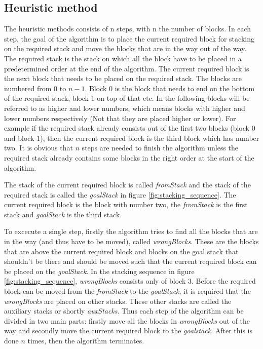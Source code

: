 \documentclass{article}
\begin{document}
	\subsection{Heuristic method}
	\par The heuristic methods consists of n steps, with n the number of blocks. 
	In each step, the goal of the algorithm is to place the current required block for stacking on the required stack and move the blocks that are in the way out of the way. The required stack is the stack on which all the block have to be placed in a predetermined order at the end of the algorithm. The current required block is the next block that needs to be placed on the required stack. The blocks are numbered from $0$ to $n-1$. Block $0$ is the block that needs to end on the bottom of the required stack, block 1 on top of that etc. In the following blocks will be referred to as higher and lower numbers, which means blocks with higher and lower numbers respectively (Not that they are placed higher or lower). For example if the required stack already consists out of the first two blocks (block $0$ and block $1$), then the current required block is the third block which has number two. It is obvious that $n$ steps are needed to finish the algorithm unless the required stack already contains some blocks in the right order at the start of the algorithm. 
	
	\par The stack of the current required block is called \textit{fromStack} and the stack of the required stack is called the \textit{goalStack} in figure \ref{fig:stacking_sequence}. The current required block is the block with number two, the \textit{fromStack} is the first stack and \textit{goalStack} is the third stack.
	
	\par To excecute a single step, firstly the algorithm tries to find all the blocks that are in the way (and thus have to be moved), called \textit{wrongBlocks}. These are the blocks that are above the current required block and blocks on the goal stack that shouldn't be there and should be moved such that the current required block can be placed on the \textit{goalStack}. In the stacking sequence in figure \ref{fig:stacking_sequence}, \textit{wrongBlocks} consists only of block $3$. Before the required block can be moved from the \textit{fromStack} to the \textit{goalStack}, it is required that the \textit{wrongBlocks} are placed on other stacks. These other stacks are called the auxiliary stacks or shortly \textit{auxStacks}. Thus each step of the algorithm can be divided in two main parts: firstly move all the blocks in \textit{wrongBlocks} out of the way and secondly move the current required block to the \textit{goalstack}. After this is done $n$ times, then the algorithm terminates.
	
\end{document}
